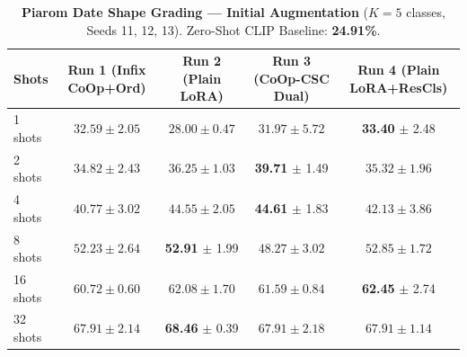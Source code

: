\documentclass[letterpaper,11pt,leqno]{article}
\begin{document}
\begin{table}[H]
\centering
\small
\setlength{\tabcolsep}{6pt}
\caption{\textbf{Piarom Date Shape Grading --- Initial Augmentation} ($K=5$ classes, Seeds 11, 12, 13). Zero-Shot CLIP Baseline: \textbf{24.91\%}.}
\label{tab:piarom_results}
\begin{tabular*}{\textwidth}{@{\extracolsep{\fill}}lcccc}
\toprule
\textbf{Shots} & \textbf{Run 1 (Infix CoOp+Ord)} & \textbf{Run 2 (Plain LoRA)} & \textbf{Run 3 (CoOp-CSC Dual)} & \textbf{Run 4 (Plain LoRA+ResCls)} \\
\midrule
 1 shots & $32.59 \pm 2.05$ & $28.00 \pm 0.47$ & $31.97 \pm 5.72$ & \cellcolor{bestgreen}\textbf{33.40} $\pm$ 2.48 \\
 2 shots & $34.82 \pm 2.43$ & $36.25 \pm 1.03$ & \cellcolor{bestgreen}\textbf{39.71} $\pm$ 1.49 & $35.32 \pm 1.96$ \\
 4 shots & $40.77 \pm 3.02$ & $44.55 \pm 2.05$ & \cellcolor{bestgreen}\textbf{44.61} $\pm$ 1.83 & $42.13 \pm 3.86$ \\
 8 shots & $52.23 \pm 2.64$ & \cellcolor{bestgreen}\textbf{52.91} $\pm$ 1.99 & $48.27 \pm 3.02$ & $52.85 \pm 1.72$ \\
16 shots & $60.72 \pm 0.60$ & $62.08 \pm 1.70$ & $61.59 \pm 0.84$ & \cellcolor{bestgreen}\textbf{62.45} $\pm$ 2.74 \\
32 shots & $67.91 \pm 2.14$ & \cellcolor{bestgreen}\textbf{68.46} $\pm$ 0.39 & $67.91 \pm 2.18$ & $67.91 \pm 1.14$ \\
\bottomrule
\end{tabular*}
\end{table}
\end{document}
